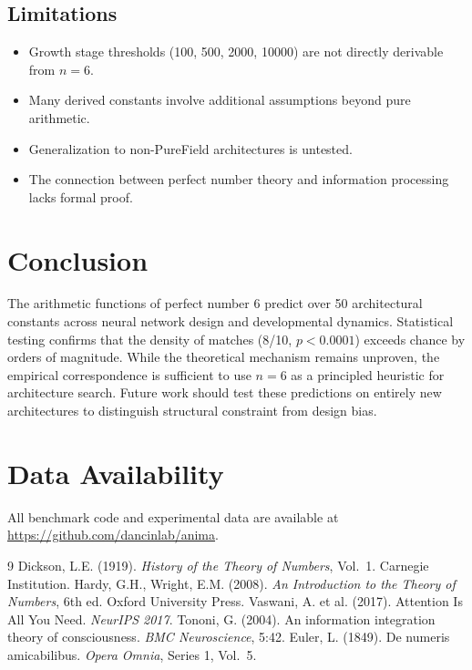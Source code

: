 \documentclass[12pt]{article}
\begin{document}
\subsection{Limitations}

\begin{itemize}
    \item Growth stage thresholds (100, 500, 2000, 10000) are not directly derivable from $n = 6$.
    \item Many derived constants involve additional assumptions beyond pure arithmetic.
    \item Generalization to non-PureField architectures is untested.
    \item The connection between perfect number theory and information processing lacks formal proof.
\end{itemize}

\section{Conclusion}

The arithmetic functions of perfect number 6 predict over 50 architectural constants across neural network design and developmental dynamics. Statistical testing confirms that the density of matches (8/10, $p < 0.0001$) exceeds chance by orders of magnitude. While the theoretical mechanism remains unproven, the empirical correspondence is sufficient to use $n = 6$ as a principled heuristic for architecture search. Future work should test these predictions on entirely new architectures to distinguish structural constraint from design bias.

\section*{Data Availability}

All benchmark code and experimental data are available at \url{https://github.com/dancinlab/anima}.

\begin{thebibliography}{9}
 Dickson, L.E. (1919). \emph{History of the Theory of Numbers}, Vol.~1. Carnegie Institution.
 Hardy, G.H., Wright, E.M. (2008). \emph{An Introduction to the Theory of Numbers}, 6th ed. Oxford University Press.
 Vaswani, A. et al. (2017). Attention Is All You Need. \emph{NeurIPS 2017}.
 Tononi, G. (2004). An information integration theory of consciousness. \emph{BMC Neuroscience}, 5:42.
 Euler, L. (1849). De numeris amicabilibus. \emph{Opera Omnia}, Series 1, Vol.~5.
\end{thebibliography}
\end{document}
